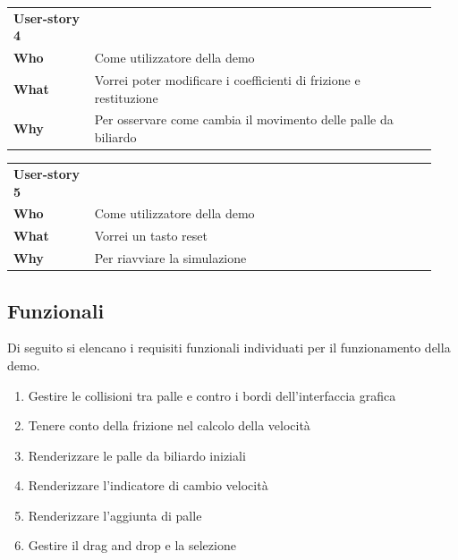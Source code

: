 \begin{table}[H]
    \begin{tabular}{p{0.18\linewidth}p{0.76\linewidth}}
        \toprule
        \textbf{User-story 4} &                                                                   \\
        \textbf{Who}          & Come utilizzatore della demo                                      \\
        \textbf{What}         & Vorrei poter modificare i coefficienti di frizione e restituzione \\
        \textbf{Why}          & Per osservare come cambia il movimento delle palle da biliardo    \\
        \bottomrule
    \end{tabular}\label{tab:user-story-4}
\end{table}
\begin{table}[H]
    \begin{tabular}{p{0.18\linewidth}p{0.76\linewidth}}
        \toprule
        \textbf{User-story 5} &                              \\
        \textbf{Who}          & Come utilizzatore della demo \\
        \textbf{What}         & Vorrei un tasto reset        \\
        \textbf{Why}          & Per riavviare la simulazione \\
        \bottomrule
    \end{tabular}\label{tab:user-story-5}
\end{table}

\subsection{Funzionali}\label{subsec:demo-funzionali}
Di seguito si elencano i requisiti funzionali individuati per il funzionamento della demo.
\begin{enumerate}
    \item Gestire le collisioni tra palle e contro i bordi dell'interfaccia grafica
    \item Tenere conto della frizione nel calcolo della velocità
    \item Renderizzare le palle da biliardo iniziali
    \item Renderizzare l'indicatore di cambio velocità
    \item Renderizzare l'aggiunta di palle
    \item Gestire il drag and drop e la selezione
\end{enumerate}


